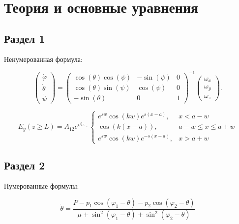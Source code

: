 \documentclass[14pt,oneside]{extarticle}
\begin{document}
\pagebreak
\section{Теория и основные уравнения}

\subsection{Раздел 1}

Ненумерованная формула:

\begin{equation}
    \begin{pmatrix} \dot{\varphi}\\ \dot{\theta} \\ \dot{\psi} \end{pmatrix}
    = \begin{pmatrix}
        \cos(\theta)\cos(\psi) & -\sin(\psi) & 0 \\
        \cos(\theta)\sin(\psi) & \cos(\psi)  & 0 \\
        -\sin(\theta)         & 0         &  1
    \end{pmatrix}^{-1}
    \begin{pmatrix} \omega_x\\ \omega_y \\ \omega_z \end{pmatrix}. \nonumber
\end{equation}


\begin{equation}
    E_{y}\left(z\geq L\right)=A_{12}e^{i\beta z}\cdot\begin{cases}
        e^{sw}\cos\left(kw\right)e^{s\left(x-a\right)}, & x<a-w\\
        \cos\left(k\left(x-a\right)\right), & a-w\leq x\le a+w\\
        e^{sw}\cos\left(kw\right)e^{-s\left(x-a\right)}, & x>a+w
        \end{cases}    
\end{equation}


\subsection{Раздел 2}

Нумерованные формулы:

\begin{equation}
\label{eq:1}
    \dot{\theta}=\frac{P-p_{1}\cos\left(\varphi_{1}-\theta\right)-p_{2}\cos\left(\varphi_{2}-\theta\right)}{\mu+\sin^{2}\left(\varphi_{1}-\theta\right)+\sin^{2}\left(\varphi_{2}-\theta\right)}
\end{equation}
\end{document}

